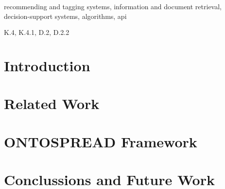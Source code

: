 \documentclass{article}[10pt]
\begin{document}
\begin{keywords}
recommending and tagging systems, information and document retrieval, decision-support systems, algorithms, api
\end{keywords}

\begin{category}
K.4, K.4.1, D.2, D.2.2
\end{category}

% 
% 
% 
% 
% 
% 

\section{Introduction}

\section{Related Work}\label{related-work}

\section{ONTOSPREAD Framework}
%

%
\section{Conclussions and Future Work}






\end{document}
